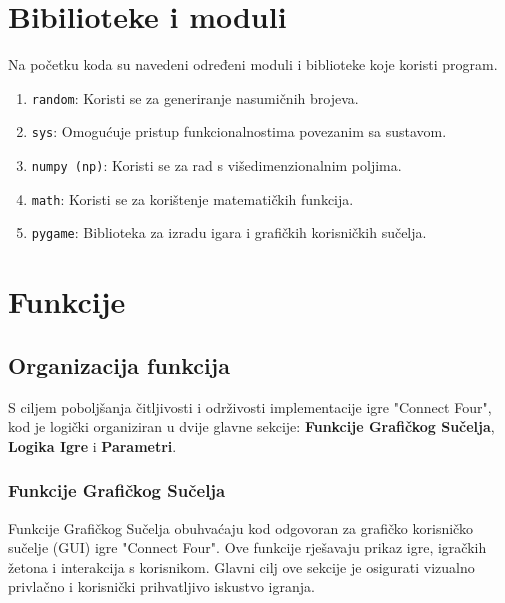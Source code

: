 \documentclass[]{foi}
\begin{document}
\section{Bibilioteke i moduli}
Na početku koda su navedeni određeni moduli i biblioteke koje koristi program.
\begin{enumerate}
    \item \texttt{random}: Koristi se za generiranje nasumičnih brojeva.
    \item \texttt{sys}: Omogućuje pristup funkcionalnostima povezanim sa sustavom.
    \item \texttt{numpy (np)}: Koristi se za rad s višedimenzionalnim poljima.
    \item \texttt{math}: Koristi se za korištenje matematičkih funkcija.
    \item \texttt{pygame}: Biblioteka za izradu igara i grafičkih korisničkih sučelja.
\end{enumerate}

\section{Funkcije}

\subsection{Organizacija funkcija}
S ciljem poboljšanja čitljivosti i održivosti implementacije igre "Connect Four", kod je logički organiziran u dvije glavne sekcije: \textbf{Funkcije Grafičkog Sučelja}, \textbf{Logika Igre} i \textbf{Parametri}.

\subsubsection{Funkcije Grafičkog Sučelja}

Funkcije Grafičkog Sučelja obuhvaćaju kod odgovoran za grafičko korisničko sučelje (GUI) igre "Connect Four". Ove funkcije rješavaju prikaz igre, igračkih žetona i interakcija s korisnikom. Glavni cilj ove sekcije je osigurati vizualno privlačno i korisnički prihvatljivo iskustvo igranja.
\end{document}
